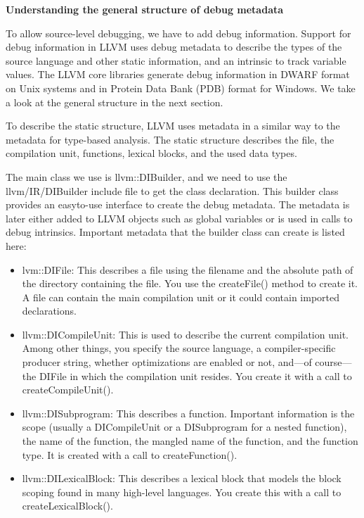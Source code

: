 

\hspace*{\fill} \par %
\textbf{Understanding the general structure of debug metadata}

To allow source-level debugging, we have to add debug information. Support for debug information in LLVM uses debug metadata to describe the types of the source language and other static information, and an intrinsic to track variable values. The LLVM core libraries generate debug information in DWARF format on Unix systems and in Protein Data Bank (PDB) format for Windows. We take a look at the general structure in the next section.\par

To describe the static structure, LLVM uses metadata in a similar way to the metadata for type-based analysis. The static structure describes the file, the compilation unit, functions, lexical blocks, and the used data types.\par

The main class we use is llvm::DIBuilder, and we need to use the llvm/IR/DIBuilder include file to get the class declaration. This builder class provides an easyto-use interface to create the debug metadata. The metadata is later either added to LLVM objects such as global variables or is used in calls to debug intrinsics. Important metadata that the builder class can create is listed here:\par

\begin{itemize}
\item lvm::DIFile: This describes a file using the filename and the absolute path of the directory containing the file. You use the createFile() method to create it. A file can contain the main compilation unit or it could contain imported declarations.

\item llvm::DICompileUnit: This is used to describe the current compilation unit. Among other things, you specify the source language, a compiler-specific producer string, whether optimizations are enabled or not, and—of course—the DIFile in which the compilation unit resides. You create it with a call to createCompileUnit().

\item llvm::DISubprogram: This describes a function. Important information is the scope (usually a DICompileUnit or a DISubprogram for a nested function), the name of the function, the mangled name of the function, and the function type. It is created with a call to createFunction().

\item llvm::DILexicalBlock: This describes a lexical block that models the block scoping found in many high-level languages. You create this with a call to createLexicalBlock().

\end{itemize}

